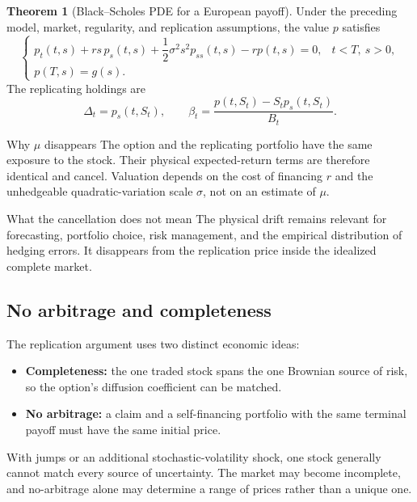\documentclass[10pt]{article}
\newcommand{\1}{\mathbf 1}
\theoremstyle{definition}
\newtheorem{theorem}[definition]{Theorem}
\begin{document}
\begin{theorem}[Black--Scholes PDE for a European payoff]
Under the preceding model, market, regularity, and replication assumptions,
the value \(p\) satisfies
\[
\boxed{
\begin{cases}
p_t(t,s)+rs\,p_s(t,s)
+\dfrac12\sigma^2s^2p_{ss}(t,s)-rp(t,s)=0,
&t<T,\ s>0,\\[0.4em]
p(T,s)=g(s).
\end{cases}}
\]
The replicating holdings are
\[
\boxed{
\Delta_t=p_s(t,S_t),
\qquad
\beta_t=\frac{p(t,S_t)-S_tp_s(t,S_t)}{B_t}.}
\]
\end{theorem}

\begin{keyidea}{Why \(\mu\) disappears}
The option and the replicating portfolio have the same exposure to the
stock. Their physical expected-return terms are therefore identical and
cancel. Valuation depends on the cost of financing \(r\) and the unhedgeable
quadratic-variation scale \(\sigma\), not on an estimate of \(\mu\).
\end{keyidea}

\begin{warningbox}{What the cancellation does not mean}
The physical drift remains relevant for forecasting, portfolio choice, risk
management, and the empirical distribution of hedging errors. It disappears
from the replication price inside the idealized complete market.
\end{warningbox}

\subsection{No arbitrage and completeness}

The replication argument uses two distinct economic ideas:

\begin{itemize}
  \item \textbf{Completeness:} the one traded stock spans the one Brownian
        source of risk, so the option's diffusion coefficient can be matched.
  \item \textbf{No arbitrage:} a claim and a self-financing portfolio with the
        same terminal payoff must have the same initial price.
\end{itemize}

With jumps or an additional stochastic-volatility shock, one stock generally
cannot match every source of uncertainty. The market may become incomplete,
and no-arbitrage alone may determine a range of prices rather than a unique
one.
\end{document}
